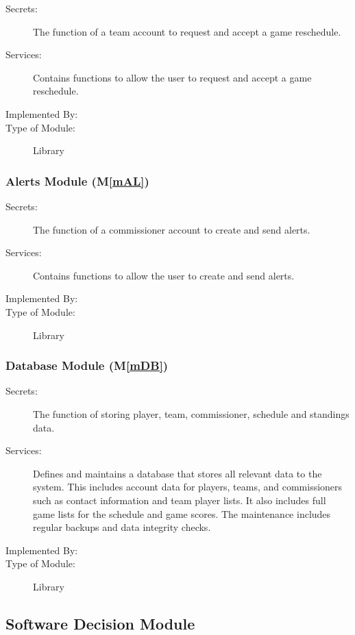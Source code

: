 \documentclass[12pt, titlepage]{article}
\newcommand{\mref}[1]{M\ref{#1}}
\begin{document}
\begin{description}
\item[Secrets:]The function of a team account to request and accept a game
reschedule.
\item[Services:]Contains functions to allow the user to request and accept a game
reschedule.
\item[Implemented By:] \progname{}
\item[Type of Module:] Library
\end{description}

\subsubsection{Alerts Module (\mref{mAL})}

\begin{description}
\item[Secrets:]The function of a commissioner account to create and send
alerts.
\item[Services:]Contains functions to allow the user to create and send alerts.
\item[Implemented By:] \progname{}
\item[Type of Module:] Library
\end{description}

\subsubsection{Database Module (\mref{mDB})}

\begin{description}
\item[Secrets:]The function of storing player, team, commissioner, schedule
and standings data.
\item[Services:]Defines and maintains a database that stores all relevant data
to the \progname{} system. This includes account data for players, teams, and
commissioners such as contact information and team player lists. It also
includes full game lists for the schedule and game scores. The maintenance
includes regular backups and data integrity checks.
\item[Implemented By:] \progname{}
\item[Type of Module:] Library
\end{description}


\subsection{Software Decision Module}
\end{document}
